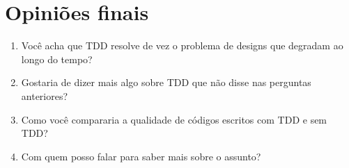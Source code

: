\section{Opiniões finais}

\begin{enumerate}
	\item Você acha que TDD resolve de vez o problema de designs que degradam ao longo do tempo?

	\item Gostaria de dizer mais algo sobre TDD que não disse nas perguntas anteriores?
	
	\item Como você compararia a qualidade de códigos escritos com TDD e sem TDD? 

	\item Com quem posso falar para saber mais sobre o assunto?
\end{enumerate}

